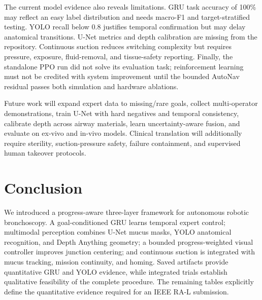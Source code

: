 \documentclass[letterpaper,10pt,conference]{ieeeconf}
\begin{document}
The current model evidence also reveals limitations. GRU task accuracy of 100\%
may reflect an easy label distribution and needs macro-F1 and target-stratified
testing. YOLO recall below 0.8 justifies temporal confirmation but may delay
anatomical transitions. U-Net metrics and depth calibration are missing from
the repository. Continuous suction reduces switching complexity but requires
pressure, exposure, fluid-removal, and tissue-safety reporting. Finally, the
standalone PPO run did not solve its evaluation task; reinforcement learning
must not be credited with system improvement until the bounded AutoNav residual
passes both simulation and hardware ablations.

Future work will expand expert data to missing/rare goals, collect multi-operator
demonstrations, train U-Net with hard negatives and temporal consistency,
calibrate depth across airway materials, learn uncertainty-aware fusion, and
evaluate on ex-vivo and in-vivo models. Clinical translation will additionally
require sterility, suction-pressure safety, failure containment, and supervised
human takeover protocols.

\section{Conclusion}

We introduced a progress-aware three-layer framework for autonomous robotic
bronchoscopy. A goal-conditioned GRU learns temporal expert control; multimodal
perception combines U-Net mucus masks, YOLO anatomical recognition, and Depth
Anything geometry; a bounded progress-weighted visual controller improves
junction centering; and continuous suction is integrated with mucus tracking,
mission continuity, and homing. Saved artifacts provide quantitative GRU and
YOLO evidence, while integrated trials establish qualitative feasibility of the
complete procedure. The remaining tables explicitly define the quantitative
evidence required for an IEEE RA-L submission.



\end{document}
